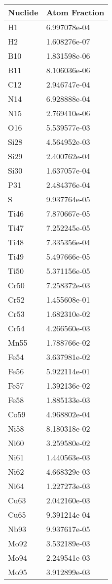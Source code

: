 \begin{centering}
\begin{longtable}[ht!]
{ p{} | p{} }
\hline
Nuclide & Atom Fraction\\
\hline
H1 & 6.997078e-04\\
H2 & 1.608276e-07\\
B10 & 1.831598e-06\\
B11 & 8.106036e-06\\
C12 & 2.946747e-04\\
N14 & 6.928888e-04\\
N15 & 2.769410e-06\\
O16 & 5.539577e-03\\
Si28 & 4.564952e-03\\
Si29 & 2.400762e-04\\
Si30 & 1.637057e-04\\
P31 & 2.484376e-04\\
S & 9.937764e-05\\
Ti46 & 7.870667e-05\\
Ti47 & 7.252245e-05\\
Ti48 & 7.335356e-04\\
Ti49 & 5.497666e-05\\
Ti50 & 5.371156e-05\\
Cr50 & 7.258372e-03\\
Cr52 & 1.455608e-01\\
Cr53 & 1.682310e-02\\
Cr54 & 4.266560e-03\\
Mn55 & 1.788766e-02\\
Fe54 & 3.637981e-02\\
Fe56 & 5.922114e-01\\
Fe57 & 1.392136e-02\\
Fe58 & 1.885133e-03\\
Co59 & 4.968802e-04\\
Ni58 & 8.180318e-02\\
Ni60 & 3.259580e-02\\
Ni61 & 1.440563e-03\\
Ni62 & 4.668329e-03\\
Ni64 & 1.227273e-03\\
Cu63 & 2.042160e-03\\
Cu65 & 9.391214e-04\\
Nb93 & 9.937617e-05\\
Mo92 & 3.532189e-03\\
Mo94 & 2.249541e-03\\
Mo95 & 3.912899e-03\\

\end{longtable}
\end{centering}
